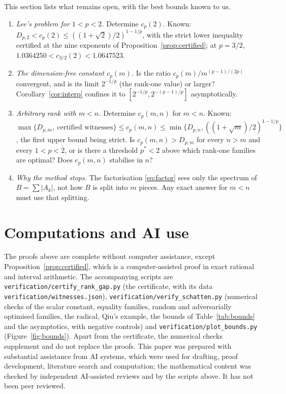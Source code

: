 \documentclass[11pt,a4paper]{article}
\numberwithin{equation}{section}
\theoremstyle{definition}
\theoremstyle{remark}
\begin{document}
This section lists what remains open, with the best bounds known to us.
\begin{enumerate}
\item \emph{Lee's problem for \(1<p<2\).} Determine \(c_p(2)\). Known:
\(D_{p,2}<c_p(2)\le((1+\sqrt2)/2)^{1-1/p}\), with the strict lower
inequality certified at the nine exponents of
Proposition~\ref{prop:certified}; at \(p=3/2\),
\(1.0364250<c_{3/2}(2)<1.0647523\).
\item \emph{The dimension-free constant \(c_p(m)\).} Is the ratio
\(c_p(m)/m^{(p-1)/(2p)}\) convergent, and is its limit \(2^{-1/p}\) (the
rank-one value) or larger? Corollary~\ref{cor:interp} confines it to
\([2^{-1/p},2^{-(p-1)/p}]\) asymptotically.
\item \emph{Arbitrary rank with \(m<n\).} Determine \(c_p(m,n)\) for
\(m<n\). Known: \(\max\{D_{p,m},\ \text{certified witnesses}\}\le
c_p(m,n)\le\min\{D_{p,n},((1+\sqrt m)/2)^{1-1/p}\}\), the first upper
bound being strict. Is \(c_p(m,n)>D_{p,m}\) for every \(n>m\) and every
\(1<p<2\), or is there a threshold \(p^*<2\) above which rank-one families
are optimal? Does \(c_p(m,n)\) stabilise in \(n\)?
\item \emph{Why the method stops.} The factorisation \eqref{eq:factor}
sees only the spectrum of \(B=\sum|A_k|\), not how \(B\) is split into
\(m\) pieces. Any exact answer for \(m<n\) must use that splitting.
\end{enumerate}

\section*{Computations and AI use}
The proofs above are complete without computer assistance, except
Proposition~\ref{prop:certified}, which is a computer-assisted proof in
exact rational and interval arithmetic. The accompanying scripts are
\texttt{verification/certify\_rank\_gap.py} (the certificate, with its
data \texttt{verification/witnesses.json}),
\texttt{verification/verify\_schatten.py} (numerical checks of the
scalar constant, equality families, random and adversarially optimised
families, the radical, Qiu's example, the bounds of
Table~\ref{tab:bounds} and the asymptotics, with negative controls) and
\texttt{verification/plot\_bounds.py} (Figure~\ref{fig:bounds}). Apart
from the certificate, the numerical checks supplement and do not replace
the proofs. This paper was prepared with substantial assistance from AI
systems, which were used for drafting, proof development, literature
search and computation; the mathematical content was checked by
independent AI-assisted reviews and by the scripts above. It has not been
peer reviewed.
\end{document}
